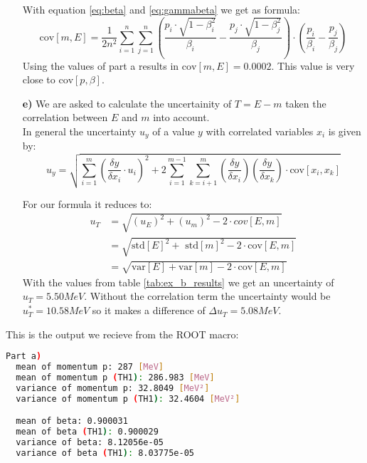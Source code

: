 \documentclass[10pt]{article}
\newenvironment{myfont}{\fontfamily{put}\selectfont}{\par}
\begin{document}
\begin{myfont}
\begin{itemize}
   With equation \ref{eq:beta} and \ref{eq:gammabeta} we get as formula:
   \begin{equation}
   \textrm{cov}[m, E] = \frac{1}{2n^2} \sum_{i=1}^n \sum_{j=1}^n \left(\frac{p_i \cdot \sqrt{1- \beta_i^2}}{\beta_i} -  \frac{p_j \cdot \sqrt{1- \beta_j^2}}{\beta_j}\right) \cdot \left(\frac{p_i}{\beta_i} - \frac{p_j}{\beta_j} \right)
   \end{equation}
   Using the values of part a results in $\textrm{cov}[m, E] = 0.0002 $. This value is very close to $\textrm{cov}[p, \beta]$.


  \item[\textbf{e)}] \label{part_e}
    We are asked to calculate the uncertainity of $T = E - m$ taken the correlation between $E$ and $m$ into account. \\
    In general the uncertainty $u_y$ of a value $y$ with correlated variables $x_i$ is given by:
   \begin{equation}
    u_y = \sqrt{\sum_{i=1}^m  \left(\frac{\delta y}{\delta x_i} \cdot u_i\right)^2 + 2 \sum_{i=1}^{m-1} \sum_{k=i+1}^{m}  \left(\frac{\delta y}{\delta x_i}\right)  \left(\frac{\delta y}{\delta x_k}\right) \cdot \textrm{cov}[x_i, x_k]}
   \end{equation}

   For our formula it reduces to:
  \begin{align}
    u_T &= \sqrt{ (u_E)^2 + (u_m)^2 - 2 \cdot cov[E, m]} \\
           &= \sqrt{ \textrm{std}[E]^2 +\textrm{ std}[m]^2 - 2 \cdot \textrm{cov}[E, m]} \\
           &= \sqrt{\textrm{var}[E] + \textrm{var}[m] - 2 \cdot \textrm{cov}[E, m]}
   \end{align}
  With the values from table \ref{tab:ex_b_results} we get an uncertainty of $u_T = 5.50 MeV$. Without the correlation term the uncertainty would be $u_T^* = 10.58 MeV$ so it makes a difference of $\Delta u_T = 5.08 MeV$.

\end{itemize}


\noindent This is the output we recieve from the ROOT macro:

\begin{lstlisting}[language=bash,caption={bash version}]
Part a)
  mean of momentum p: 287 [MeV]
  mean of momentum p (TH1): 286.983 [MeV]
  variance of momentum p: 32.8049 [MeV²]
  variance of momentum p (TH1): 32.4604 [MeV²]

  mean of beta: 0.900031
  mean of beta (TH1): 0.900029
  variance of beta: 8.12056e-05
  variance of beta (TH1): 8.03775e-05


\end{lstlisting}
\end{myfont}
\end{document}
